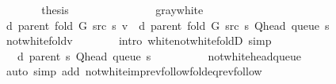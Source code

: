 \begin{isabellebody}
\ \ \ \ \isamarkupfalse%
\ \isamarkupfalse%
\ {\isacharquery}{\kern0pt}thesis\isanewline
\ \ \ \ \ \ \isacommand{{\isachardot}{\kern0pt}}\isamarkupfalse%
\isanewline
\ \ \isamarkupfalse%
\isanewline
\ \ \ \ \isamarkupfalse%
\ gray{\isacharunderscore}{\kern0pt}white\isanewline
\ \ \ \ \isamarkupfalse%
\ {\isachardoublequoteopen}d\ {\isacharparenleft}{\kern0pt}parent\ {\isacharparenleft}{\kern0pt}fold\ G\ src\ s{\isacharparenright}{\kern0pt}{\isacharparenright}{\kern0pt}\ v\ {\isacharequal}{\kern0pt}\ d\ {\isacharparenleft}{\kern0pt}parent\ {\isacharparenleft}{\kern0pt}fold\ G\ src\ s{\isacharparenright}{\kern0pt}{\isacharparenright}{\kern0pt}\ {\isacharparenleft}{\kern0pt}Q{\isacharunderscore}{\kern0pt}head\ {\isacharparenleft}{\kern0pt}queue\ s{\isacharparenright}{\kern0pt}{\isacharparenright}{\kern0pt}\ {\isacharplus}{\kern0pt}\ {}{\isachardoublequoteclose}\isanewline
\ \ \ \ \ \ \isamarkupfalse%
\ not{\isacharunderscore}{\kern0pt}white{\isacharunderscore}{\kern0pt}fold{\isacharunderscore}{\kern0pt}v\isanewline
\ \ \ \ \ \ \isamarkupfalse%
\ {\isacharparenleft}{\kern0pt}intro\ white{\isacharunderscore}{\kern0pt}not{\isacharunderscore}{\kern0pt}white{\isacharunderscore}{\kern0pt}foldD{\isacharparenleft}{\kern0pt}{}{\isacharparenright}{\kern0pt}{\isacharparenright}{\kern0pt}\ simp\isanewline
\ \ \ \ \isamarkupfalse%
\ \isamarkupfalse%
\ {\isachardoublequoteopen}{\isachardot}{\kern0pt}{\isachardot}{\kern0pt}{\isachardot}{\kern0pt}\ {\isacharequal}{\kern0pt}\ d\ {\isacharparenleft}{\kern0pt}parent\ s{\isacharparenright}{\kern0pt}\ {\isacharparenleft}{\kern0pt}Q{\isacharunderscore}{\kern0pt}head\ {\isacharparenleft}{\kern0pt}queue\ s{\isacharparenright}{\kern0pt}{\isacharparenright}{\kern0pt}\ {\isacharplus}{\kern0pt}\ {}{\isachardoublequoteclose}\isanewline
\ \ \ \ \ \ \isamarkupfalse%
\ not{\isacharunderscore}{\kern0pt}white{\isacharunderscore}{\kern0pt}head{\isacharunderscore}{\kern0pt}queue\isanewline
\ \ \ \ \ \ \isamarkupfalse%
\ {\isacharparenleft}{\kern0pt}auto\ simp\ add{\isacharcolon}{\kern0pt}\ not{\isacharunderscore}{\kern0pt}white{\isacharunderscore}{\kern0pt}imp{\isacharunderscore}{\kern0pt}rev{\isacharunderscore}{\kern0pt}follow{\isacharunderscore}{\kern0pt}fold{\isacharunderscore}{\kern0pt}eq{\isacharunderscore}{\kern0pt}rev{\isacharunderscore}{\kern0pt}follow{\isacharparenright}{\kern0pt}\isanewline
\ \ \ \ \isamarkupfalse%

\end{isabellebody}
